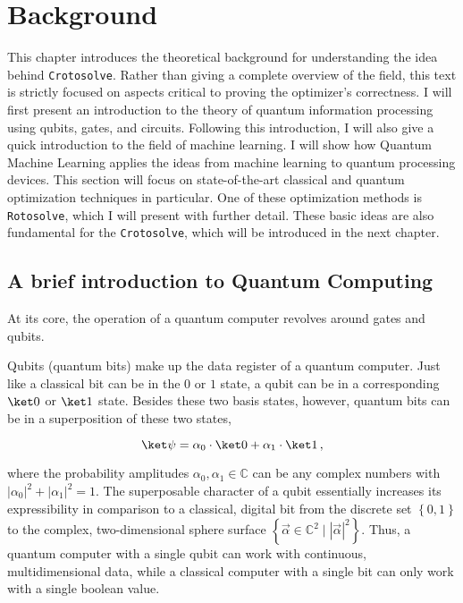 \chapter{Background}
\label{chap:background}

This chapter introduces the theoretical background for understanding the idea
behind \texttt{Crotosolve}.
Rather than giving a complete overview of the field, this text is strictly
focused on aspects critical to proving the optimizer's correctness.
I will first present an introduction to the theory of quantum information
processing using qubits, gates, and circuits.
Following this introduction, I will also give a quick introduction to the field
of machine learning.
I will show how Quantum Machine Learning applies the ideas from machine learning
to quantum processing devices.
This section will focus on state-of-the-art classical and quantum optimization
techniques in particular.
One of these optimization methods is \texttt{Rotosolve}, which I will present
with further detail.
These basic ideas are also fundamental for the \texttt{Crotosolve}, which will
be introduced in the next chapter.

\section{A brief introduction to Quantum Computing}
\label{sec:quantum-intro}
At its core, the operation of a quantum computer revolves around gates and
qubits.

Qubits (quantum bits) make up the data register of a quantum computer.
Just like a classical bit can be in the $0$ or $1$ state, a qubit can be in a
corresponding $\ket 0$ or $\ket 1$ state.
Besides these two basis states, however, quantum bits can be in a superposition
of these two states,

$$\ket \psi = \alpha_0 \cdot \ket 0 + \alpha_1 \cdot \ket 1\,,$$

where the probability amplitudes $\alpha_0, \alpha_1 \in \mathbb C$ can be any
complex numbers with $\left|\alpha_0\right|^2 + \left|\alpha_1\right|^2 = 1$.
The superposable character of a qubit essentially increases its expressibility
in comparison to a classical, digital bit from the discrete set
$\left\{0, 1\right\}$ to the complex, two-dimensional sphere surface
$\left\{\vec \alpha \in \mathbb C^2 \mid \left|\vec\alpha\right|^2\right\}$.
Thus, a quantum computer with a single qubit can work with continuous,
multidimensional data, while a classical computer with a single bit can only
work with a single boolean value.

